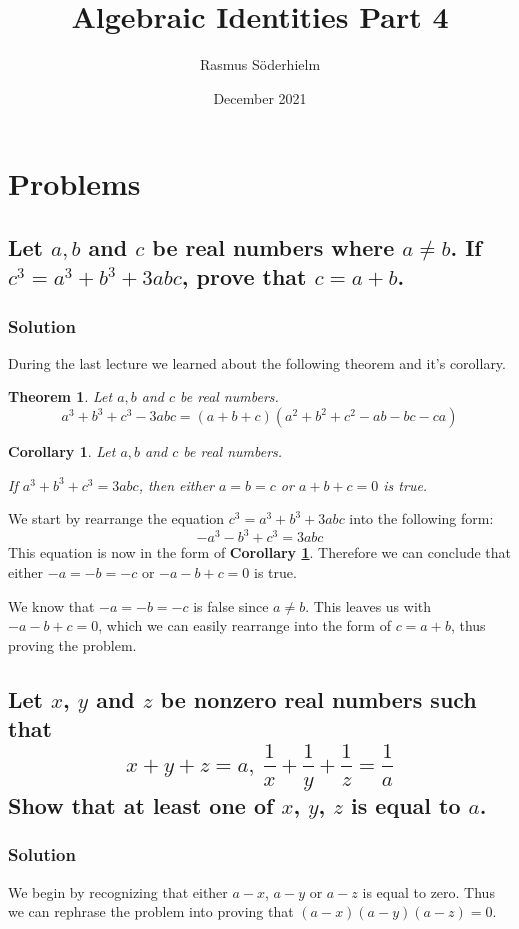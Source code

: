 \documentclass{article}
\title{Algebraic Identities Part 4}
\author{Rasmus Söderhielm}
\date{December 2021}
\newcommand{\solution}{\subsubsection*{\textcolor{MainColor}{Solution}}}
\newcounter{theoremcounter}
\theoremstyle{maintheorem}
\newtheorem{theorem}[theoremcounter]{\textcolor{SubColor}{Theorem}}
\newtheorem{corollary}{\textcolor{SubColor}{Corollary}}
\newcommand{\corref}[1]{\textcolor{SubSubColor}{\textbf{Corollary \ref{#1}}}}
\begin{document}
\linespread{1.5}\selectfont

\maketitle

\section*{\color{MainColor}Problems} \label{section}

\subsection{
	\normalfont
	Let $a, b$ and $c$ be real numbers where $a \neq b$. If $c^3 = a^3 + b^3 + 3abc$, prove that $c=a+b$.
}

\solution

During the last lecture we learned about the following theorem and it's corollary.
\begin{theorem}\label{thm1}
	Let $a, b$ and $c$ be real numbers.
	\[ a^3 + b^3 + c^3 - 3abc = (a + b + c)(a^2 + b^2 + c^2 - ab - bc - ca) \]
\end{theorem}
\begin{corollary}\label{cor1}
	Let $a, b$ and $c$ be real numbers.

	If $a^3 + b^3 + c^3 = 3abc$, then either $a = b = c$ or $a + b + c = 0$ is true.
\end{corollary}

We start by rearrange the equation $ c^3 = a^3 + b^3 + 3abc $ into the following form:
\[ -a^3 - b^3 + c^3 = 3abc \]
This equation is now in the form of \corref{cor1}. Therefore we can conclude that either $-a = -b = -c$ or $-a - b + c = 0$ is true.

We know that $ -a = -b = -c $ is false since $a \neq b$. This leaves us with $-a - b + c = 0$, which we can easily rearrange into the form of $c = a + b$, thus proving the problem.

\subsection{
	\normalfont
	Let $x$, $y$ and $z$ be nonzero real numbers such that
	\[x + y + z = a,\ \frac{1}{x} + \frac{1}{y} + \frac{1}{z} = \frac{1}{a}\]
	Show that at least one of $x$, $y$, $z$ is equal to $a$.
}

\solution

We begin by recognizing that either $a - x$, $a - y$ or $a - z$ is equal to zero. Thus we can rephrase the problem into proving that $ (a - x)(a - y)(a - z) = 0 $.
\end{document}
